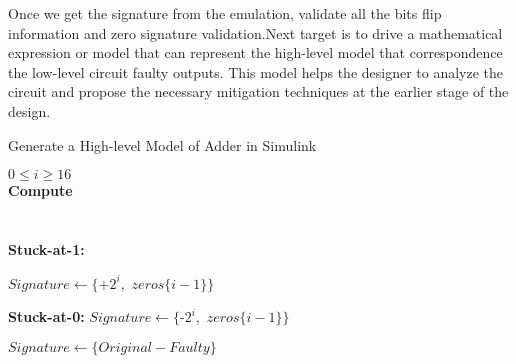 Once we get the signature from the emulation, validate all the bits flip information and zero signature validation.Next target is to drive a mathematical expression or model that can represent the high-level model that correspondence the low-level circuit faulty outputs. This model helps the designer to analyze the circuit and propose the necessary mitigation techniques at the earlier stage of the design. 



\begin{algorithm}
\caption{Generate a High-level Model of  Adder in Simulink}
\begin{algorithmic}
\REQUIRE $0\leq i \geq16$ \\
\textbf{Compute}\\ 
\hspace{1.5cm}{$Original =  A $ $ $+$ $ $ B$ } \\
\hspace{1.5cm}{$Faulty =  A $ $ $+$ $ $ B$ } \\
\vspace{0.20 cm }
\textbf{Stuck-at-1:}
\vspace{0.20 cm }

\vspace{0.10 cm }
\STATE $Signature \leftarrow  \{$+$ 2^{i},$ $ $$zeros$$\{i-1\}\}$
\vspace{0.10 cm }
\ENDIF
\vspace{0.20 cm }

\textbf{Stuck-at-0:}
\vspace{0.20 cm }
\vspace{0.10 cm }
\STATE $Signature \leftarrow  \{$-$ 2^{i},$ $ $$zeros$$\{i-1\}\}$
\vspace{0.10 cm }
\ENDIF



\vspace{0.20 cm }

\vspace{0.20 cm }
\vspace{0.10 cm }
\STATE $Signature \leftarrow  \{$$Original-Faulty$$\}$
\vspace{0.10 cm }
\ENDIF




\end{algorithmic}
\end{algorithm}


